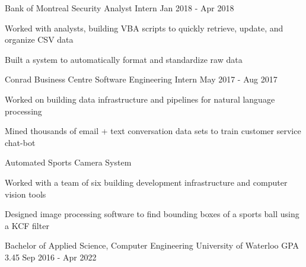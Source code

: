 \documentclass[11pt, a4paper]{awesome-cv}
\begin{document}
\begin{siderules1}
\begin{cventries}
{    }
  \cventry
    {\textit{}}
    {Bank of Montreal}
    {Security Analyst Intern}
    {Jan 2018 - Apr 2018}
    {
      \begin{cvitems}
        \item {Worked with analysts, building VBA scripts to quickly retrieve, update, and organize CSV data}
        \item {Built a system to automatically format and standardize raw data}
      \end{cvitems}
    }
  \cventry
    {\textit{}}
    {Conrad Business Centre}
    {Software Engineering Intern}
    {May 2017 - Aug 2017}
    {
      \begin{cvitems}
        \item {Worked on building data infrastructure and pipelines for natural language processing}
        \item {Mined thousands of email + text conversation data sets to train customer service chat-bot}
      \end{cvitems}
    }
\end{cventries}
\end{siderules1}

\begin{siderules2}
\begin{cventries}
    \cventry
        {\textit{}}
        {Automated Sports Camera System}
        {}
        {}
        {
          \begin{cvitems}
            \item {Worked with a team of six building development infrastructure and computer vision tools}
            \item {Designed image processing software to find bounding boxes of a sports ball using a KCF filter}
          \end{cvitems}
        }
\end{cventries}
\end{siderules2}
\begin{siderules3}
\begin{cventries}
    \education
    {\fontsize{11pt}{1.3em}\bodyfont\upshape\color{text}\selectfont Bachelor of Applied Science, Computer Engineering}
    {University of Waterloo}
    {GPA 3.45}
    {Sep 2016 - Apr 2022}
    {
      \begin{cvitems}
      \end{cvitems}
    }
\end{cventries}
\end{siderules3}
\end{document}
